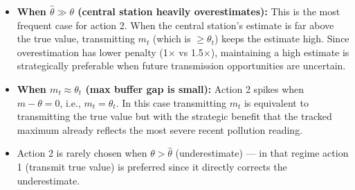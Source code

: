 \documentclass[12pt, a4paper]{article}
\begin{document}
\begin{itemize}
    \item \textbf{When $\hat{\theta} \gg \theta$ (central station heavily overestimates):} This is the most frequent case for action 2. When the central station's estimate is far above the true value, transmitting $m_t$ (which is $\geq \theta_t$) keeps the estimate high. Since overestimation has lower penalty (1$\times$ vs 1.5$\times$), maintaining a high estimate is strategically preferable when future transmission opportunities are uncertain.
    \item \textbf{When $m_t \approx \theta_t$ (max buffer gap is small):} Action 2 spikes when $m - \theta = 0$, i.e., $m_t = \theta_t$. In this case transmitting $m_t$ is equivalent to transmitting the true value but with the strategic benefit that the tracked maximum already reflects the most severe recent pollution reading.
    \item Action 2 is rarely chosen when $\theta > \hat{\theta}$ (underestimate) — in that regime action 1 (transmit true value) is preferred since it directly corrects the underestimate.
\end{itemize}
\end{document}
